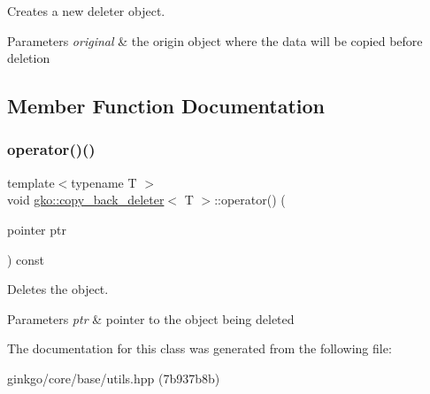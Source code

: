 Creates a new deleter object. 


\begin{DoxyParams}{Parameters}
{\em original} & the origin object where the data will be copied before deletion \\
\hline
\end{DoxyParams}


\subsection{Member Function Documentation}
\mbox{\label{classgko_1_1copy__back__deleter_a34bba76c78c23dccd814969e98c78b1b}} 
\subsubsection{\texorpdfstring{operator()()}{operator()()}}
{\footnotesize\ttfamily template$<$typename T $>$ \\
void \hyperlink{classgko_1_1copy__back__deleter}{gko\+::copy\+\_\+back\+\_\+deleter}$<$ T $>$\+::operator() (\begin{DoxyParamCaption}\item[{pointer}]{ptr }\end{DoxyParamCaption}) const}



Deletes the object. 


\begin{DoxyParams}{Parameters}
{\em ptr} & pointer to the object being deleted \\
\hline
\end{DoxyParams}


The documentation for this class was generated from the following file\+:\begin{DoxyCompactItemize}
\item 
ginkgo/core/base/utils.\+hpp (7b937b8b)\end{DoxyCompactItemize}
